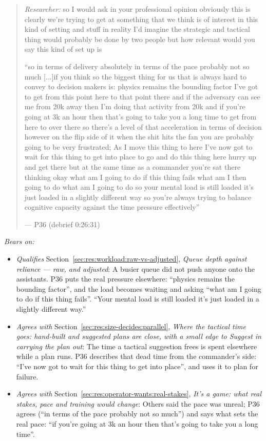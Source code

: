 \begin{quote}\small
{\footnotesize\textit{Researcher:} so I would ask in your professional opinion obviously this is clearly we're trying to get at something that we think is of interest in this kind of setting and stuff in reality I'd imagine the strategic and tactical thing would probably be done by two people but how relevant would you say this kind of set up is}\par\smallskip
``so in terms of delivery absolutely in terms of the pace probably not so much [...]if you think so the biggest thing for us that is always hard to convey to decision makers is: physics remains the bounding factor I've got to get from this point here to that point there and if the adversary can see me from 20k away then I'm doing that activity from 20k and if you're going at 3k an hour then that's going to take you a long time to get from here to over there so there's a level of that acceleration in terms of decision however on the flip side of it when the shit hits the fan you are probably going to be very frustrated; As I move this thing to here I've now got to wait for this thing to get into place to go and do this thing here hurry up and get there but at the same time as a commander you're sat there thinking okay what am I going to do if this thing fails what am I then going to do what am I going to do so your mental load is still loaded it's just loaded in a slightly different way so you're always trying to balance cognitive capacity against the time pressure effectively''\par\hfill--- P36 (debrief 0:26:31)
\end{quote}

\noindent\textit{Bears on:}
\begin{itemize}[leftmargin=1.2em,itemsep=1pt]\small
\item \textit{Qualifies} Section~\ref{sec:res:workload:raw-vs-adjusted}, \emph{Queue depth against reliance --- raw, and adjusted}: A busier queue did not push anyone onto the assistants. P36 puts the real pressure elsewhere: ``physics remains the bounding factor'', and the load becomes waiting and asking ``what am I going to do if this thing fails''. ``Your mental load is still loaded it's just loaded in a slightly different way.''
\item \textit{Agrees with} Section~\ref{sec:res:size-decides:parallel}, \emph{Where the tactical time goes: hand-built and suggested plans are close, with a small edge to Suggest in carrying the plan out}: The time a tactical suggestion frees is spent elsewhere while a plan runs. P36 describes that dead time from the commander's side: ``I've now got to wait for this thing to get into place'', and uses it to plan for failure.
\item \textit{Agrees with} Section~\ref{sec:res:operator-wants:real-stakes}, \emph{It's a game: what real stakes, pace and training would change}: Others said the pace was unreal; P36 agrees (``in terms of the pace probably not so much'') and says what sets the real pace: ``if you're going at 3k an hour then that's going to take you a long time''.
\end{itemize}

